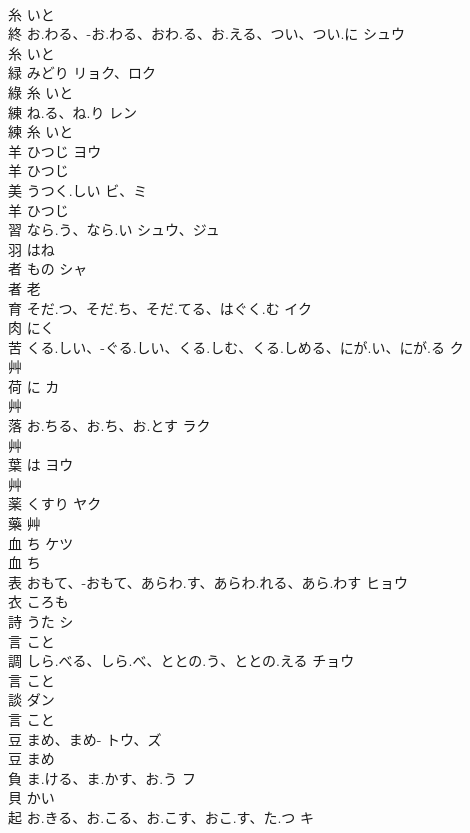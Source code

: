 \documentclass[8pt]{extreport}
\begin{document}
\begin{CJK}{UTF8}{min}
\\	糸		いと		
\\	終	お.わる、-お.わる、おわ.る、お.える、つい、つい.に	シュウ	
\\	糸		いと		
\\	緑	みどり	リョク、ロク	
\\	綠	糸		いと		
\\	練	ね.る、ね.り	レン	
\\	練	糸		いと		
\\	羊	ひつじ	ヨウ	
\\	羊		ひつじ		
\\	美	うつく.しい	ビ、ミ	
\\	羊		ひつじ		
\\	習	なら.う、なら.い	シュウ、ジュ	
\\	羽		はね		
\\	者	もの	シャ	
\\	者	老				
\\	育	そだ.つ、そだ.ち、そだ.てる、はぐく.む	イク	
\\	肉		にく		
\\	苦	くる.しい、-ぐる.しい、くる.しむ、くる.しめる、にが.い、にが.る	ク	
\\	艸				
\\	荷	に	カ	
\\	艸				
\\	落	お.ちる、お.ち、お.とす	ラク	
\\	艸				
\\	葉	は	ヨウ	
\\	艸				
\\	薬	くすり	ヤク	
\\	藥	艸				
\\	血	ち	ケツ	
\\	血		ち		
\\	表	おもて、-おもて、あらわ.す、あらわ.れる、あら.わす	ヒョウ	
\\	衣		ころも		
\\	詩	うた	シ	
\\	言		こと		
\\	調	しら.べる、しら.べ、ととの.う、ととの.える	チョウ	
\\	言		こと		
\\	談		ダン	
\\	言		こと		
\\	豆	まめ、まめ-	トウ、ズ	
\\	豆		まめ		
\\	負	ま.ける、ま.かす、お.う	フ	
\\	貝		かい		
\\	起	お.きる、お.こる、お.こす、おこ.す、た.つ	キ	

\end{CJK}
\end{document}
